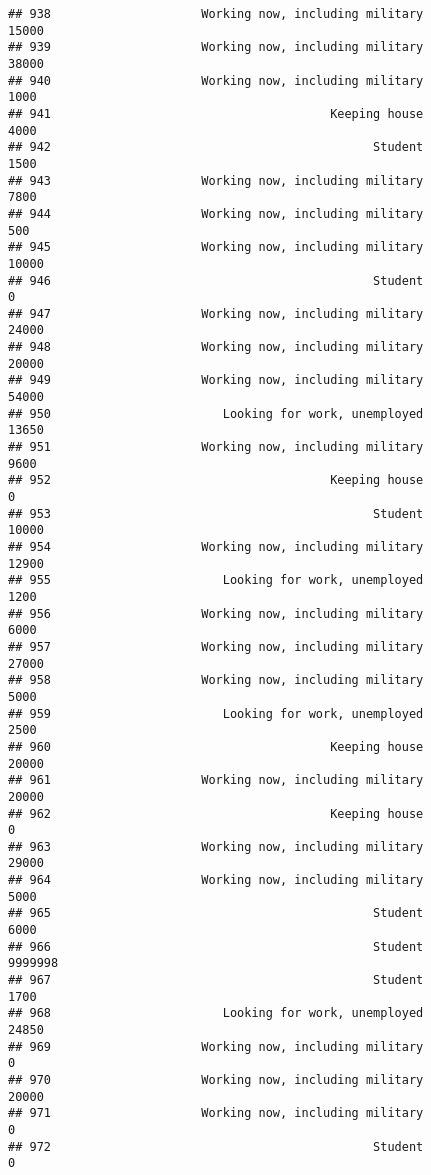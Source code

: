 \documentclass[]{book}
\theoremstyle{definition}
\theoremstyle{definition}
\theoremstyle{remark}
\begin{document}
\begin{verbatim}
## 938                     Working now, including military           15000
## 939                     Working now, including military           38000
## 940                     Working now, including military            1000
## 941                                       Keeping house            4000
## 942                                             Student            1500
## 943                     Working now, including military            7800
## 944                     Working now, including military             500
## 945                     Working now, including military           10000
## 946                                             Student               0
## 947                     Working now, including military           24000
## 948                     Working now, including military           20000
## 949                     Working now, including military           54000
## 950                        Looking for work, unemployed           13650
## 951                     Working now, including military            9600
## 952                                       Keeping house               0
## 953                                             Student           10000
## 954                     Working now, including military           12900
## 955                        Looking for work, unemployed            1200
## 956                     Working now, including military            6000
## 957                     Working now, including military           27000
## 958                     Working now, including military            5000
## 959                        Looking for work, unemployed            2500
## 960                                       Keeping house           20000
## 961                     Working now, including military           20000
## 962                                       Keeping house               0
## 963                     Working now, including military           29000
## 964                     Working now, including military            5000
## 965                                             Student            6000
## 966                                             Student         9999998
## 967                                             Student            1700
## 968                        Looking for work, unemployed           24850
## 969                     Working now, including military               0
## 970                     Working now, including military           20000
## 971                     Working now, including military               0
## 972                                             Student               0

\end{verbatim}
\end{document}
